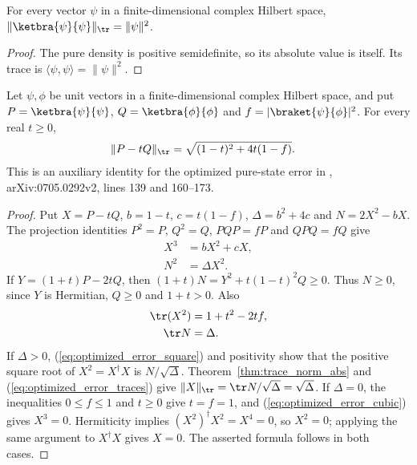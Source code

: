 \begin{theorem}
    \label{thm:pure_density_trace_norm}
    \leanok
    For every vector $\psi$ in a finite-dimensional complex Hilbert space,
    $\lVert\ketbra{\psi}{\psi}\rVert_{\tr}=\lVert\psi\rVert^2$.
\end{theorem}
\begin{proof}\leanok
    The pure density is positive semidefinite, so its absolute value is
    itself. Its trace is $\langle\psi,\psi\rangle=\lVert\psi\rVert^2$.
\end{proof}

\begin{theorem}
    \label{thm:weighted_pure_trace_norm}
    \leanok
    Let $\psi,\phi$ be unit vectors in a finite-dimensional complex Hilbert
    space, and put $P=\ketbra{\psi}{\psi}$,
    $Q=\ketbra{\phi}{\phi}$ and $f=|\braket{\psi}{\phi}|^2$.
    For every real $t\ge0$,
    \begin{align}
        \lVert P-tQ\rVert_{\tr}
         & =\sqrt{(1-t)^2+4t(1-f)}.
        \label{eq:optimized_error_weighted}
    \end{align}
    This is an auxiliary identity for the optimized pure-state error
    in \cite{Schuch2008Entropy}, arXiv:0705.0292v2, lines 139 and 160--173.
\end{theorem}
\begin{proof}\leanok
    Put $X=P-tQ$, $b=1-t$, $c=t(1-f)$,
    $\Delta=b^2+4c$ and $N=2X^2-bX$.
    The projection identities $P^2=P$, $Q^2=Q$, $PQP=fP$ and $QPQ=fQ$ give
    \begin{align}
        X^3 & =bX^2+cX, \label{eq:optimized_error_cubic} \\
        N^2 & =\Delta X^2.
        \label{eq:optimized_error_square}
    \end{align}
    If $Y=(1+t)P-2tQ$, then
    $(1+t)N=Y^2+t(1-t)^2Q\ge0$.
    Thus $N\ge0$, since $Y$ is Hermitian, $Q\ge0$ and $1+t>0$.
    Also
    \begin{align}
        \tr(X^2) & =1+t^2-2tf, \notag \\
        \tr N    & =\Delta.
        \label{eq:optimized_error_traces}
    \end{align}
    If $\Delta>0$, (\ref{eq:optimized_error_square}) and positivity show
    that the positive square root of $X^2=X^\dagger X$ is $N/\sqrt\Delta$.
    Theorem~\ref{thm:trace_norm_abs} and (\ref{eq:optimized_error_traces}) give
    $\lVert X\rVert_{\tr}=\tr N/\sqrt\Delta=\sqrt\Delta$.
    If $\Delta=0$, the inequalities $0\le f\le1$ and $t\ge0$ give
    $t=f=1$, and (\ref{eq:optimized_error_cubic}) gives $X^3=0$.
    Hermiticity implies $(X^2)^\dagger X^2=X^4=0$, so $X^2=0$;
    applying the same argument to $X^\dagger X$ gives $X=0$.
    The asserted formula follows in both cases.
\end{proof}

